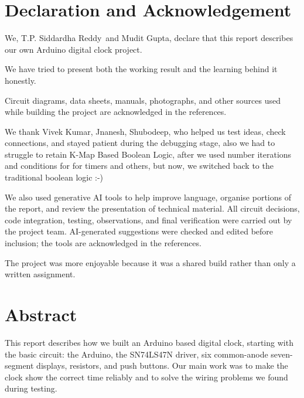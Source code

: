 \documentclass[12pt,letterpaper]{article}
\newcommand{\TeamMemberOne}{T.P. Siddardha Reddy}
\newcommand{\TeamMemberTwo}{Mudit Gupta}
\newcommand{\GuideName}{Vivek Kumar, Jnanesh, Shubodeep}
\begin{document}


\vspace{22mm}

\noindent

\clearpage
\section*{Declaration and Acknowledgement}


We, \TeamMemberOne\ and \TeamMemberTwo,
declare that this report describes our own Arduino
digital clock project.

We have tried to present both the working result
and the learning behind it honestly.

Circuit diagrams, data sheets, manuals,
photographs, and other sources used while building
the project are acknowledged in the references.

We thank \GuideName, who helped us test ideas, check
connections, and stayed patient during the debugging
stage, also we had to struggle to retain K-Map Based 
Boolean Logic, after we used number iterations and 
conditions for for timers and others, but now, we switched
back to the traditional boolean logic :-)

We also used generative AI tools to help improve language,
organise portions of the report, and review the presentation
of technical material. All circuit decisions, code integration,
testing, observations, and final verification were carried out
by the project team. AI-generated suggestions were checked and
edited before inclusion; the tools are acknowledged in the
references.

The project was more enjoyable because it was a
shared build rather than only a written assignment.

\section*{Abstract}


This report describes how we built an Arduino based
digital clock, starting with the basic circuit: the Arduino,
the SN74LS47N driver, six common-anode seven-segment displays,
resistors, and push buttons. Our main work was to make the
clock show the correct time reliably and to solve the wiring
problems we found during testing.
\end{document}
